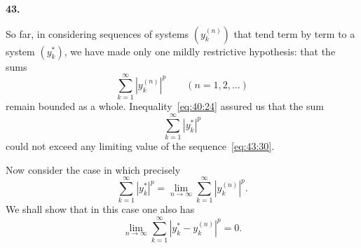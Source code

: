 \documentclass[
  paper=b5,
  fontsize=13pt,
  twoside=true,
  open=any,
  bookmarkpackage=false,
  chapterprefix=true,
  headings=normal
]{scrbook}
\theoremstyle{definition}
\newcommand{\numberedparagraph}[1]{%
  \par\medskip\phantomsection\label{sec:#1}%
  \noindent\textbf{#1.}\enspace
}
\begin{document}
\numberedparagraph{43}
So far, in considering sequences of systems $(y_k^{(n)})$ that tend term by term to a system $(y_k^*)$, we have made only one mildly restrictive hypothesis: that the sums
\begin{equation}
 \sum_{k=1}^{\infty}|y_k^{(n)}|^p
 \qquad(n=1,2,\ldots)
 \tag{30}\label{eq:43:30}
\end{equation}
remain bounded as a whole. Inequality~\eqref{eq:40:24} assured us that the sum
\begin{equation}
 \sum_{k=1}^{\infty}|y_k^*|^p
 \tag{31}\label{eq:43:31}
\end{equation}
could not exceed any limiting value of the sequence~\eqref{eq:43:30}.

Now consider the case in which precisely
\begin{equation}
 \sum_{k=1}^{\infty}|y_k^*|^p
 =\lim_{n\to\infty}\sum_{k=1}^{\infty}|y_k^{(n)}|^p.
 \tag{32}\label{eq:43:32}
\end{equation}
We shall show that in this case one also has
\begin{equation}
 \lim_{n\to\infty}\sum_{k=1}^{\infty}|y_k^*-y_k^{(n)}|^p=0.
 \tag{33}\label{eq:43:33}
\end{equation}
\end{document}
